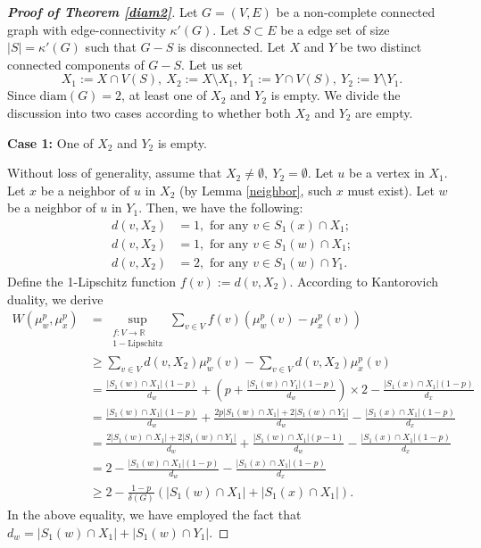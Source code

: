 \documentclass[10pt,a4paper]{article}
\theoremstyle{definition}
\theoremstyle{definition}
\theoremstyle{nonumber}
\newtheorem*{theorem*}{Theorem}
\begin{document}

\begin{proof}[\bf{Proof of Theorem \ref{diam2}}]
Let $G=(V,E)$ be a non-complete connected graph with edge-connectivity $\kappa'(G)$. Let $S \subset E$ be a edge set of size $|S| = \kappa'(G)$ such that $G - S$ is disconnected. Let $X$ and $Y$ be two distinct connected components of $G - S$.
Let us set
$$
X_1:=X\cap V(S),\ X_2:=X \setminus X_1,\ Y_1:=Y\cap V(S),\ Y_2:=Y \setminus Y_1.
$$
Since $\mathrm{diam}(G)=2$, at least one of $X_2$ and $Y_2$ is empty. We divide the discussion into two cases according to whether both $X_2$ and $Y_2$ are empty.

\textbf{Case 1:} One of $X_2$ and $Y_2$ is empty.

Without loss of generality, assume that $X_2\ne\emptyset,\ Y_2=\emptyset$.
Let $u$ be a vertex in $X_1$. Let $x$ be a neighbor of $u$ in $X_2$ (by Lemma \ref{neighbor}, such $x$ must exist). Let $w$ be a neighbor of $u$ in $Y_1$. Then, we have the following:
\begin{align*} 
d(v, X_2) &= 1, \text{ for any } v \in S_1(x) \cap X_1;\\
d(v, X_2) &= 1, \text{ for any } v \in S_1(w) \cap X_1;\\
d(v, X_2) &= 2, \text{ for any } v \in S_1(w) \cap Y_1.
\end{align*}
Define the 1-Lipschitz function $f(v):=d(v, X_2)$. According to Kantorovich duality, we derive
\begin{align*}
W(\mu_w^p, \mu_x^p) &= \sup_{\substack{f: V \to \mathbb{R} \\ 1-\text{Lipschitz}}} \sum_{v \in V} f(v) \left( \mu_w^p(v) - \mu_x^p(v) \right)\\
&\geq \sum_{v \in V} d(v, X_2) \mu_w^p(v) - \sum_{v \in V} d(v, X_2) \mu_x^p(v)\\
&= \frac{|S_1(w) \cap X_1|(1-p)}{d_w} + \left( p + \frac{|S_1(w) \cap Y_1|(1-p)}{d_w} \right) \times 2 - \frac{|S_1(x) \cap X_1|(1-p)}{d_x}\\
&= \frac{|S_1(w) \cap X_1|(1-p)}{d_w} +  \frac{2p|S_1(w) \cap X_1|+2|S_1(w) \cap Y_1|}{d_w} - \frac{|S_1(x) \cap X_1|(1-p)}{d_x}\\
&= \frac{2|S_1(w) \cap X_1|+2|S_1(w) \cap Y_1|}{d_w} +  \frac{|S_1(w) \cap X_1|(p-1)}{d_w} - \frac{|S_1(x) \cap X_1|(1-p)}{d_x}\\
&= 2 - \frac{|S_1(w) \cap X_1|(1-p)}{d_w} - \frac{|S_1(x) \cap X_1|(1-p)}{d_x}\\
&\geq 2 - \frac{1-p}{\delta(G)} \left( |S_1(w) \cap X_1| + |S_1(x) \cap X_1| \right).
\end{align*}
In the above equality, we have employed the fact that $d_w = |S_1(w) \cap X_1| + |S_1(w) \cap Y_1|$.


\end{proof}
\end{document}
